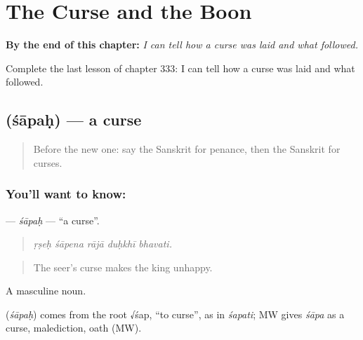 
\chapter{The Curse and the Boon}
\label{ch:sa-the-curse-and-the-boon}

\begin{chapteropening}
\textbf{By the end of this chapter:} \emph{I can tell how a curse was laid and what followed.}

Complete the last lesson of chapter 333: I can tell how a curse was laid and what followed.
\end{chapteropening}

\section[\texorpdfstring{\sk{शापः} (śāpaḥ)}{शापः (śāpaḥ)}]{ (śāpaḥ) — a curse}

\label{lesson:SA-C333-sapah}



\begin{quote}
Before the new one: say the Sanskrit for penance, then the Sanskrit for curses.
\end{quote}

\subsection*{You'll want to know: }
\textbf{} — \emph{śāpaḥ} — \textquotedblleft{}a curse\textquotedblright{}.

\begin{quote}
    
\end{quote}

\begin{quote}
\emph{ṛṣeḥ śāpena rājā duḥkhī bhavati.}
\end{quote}

\begin{quote}
The seer's curse makes the king unhappy.
\end{quote}

A masculine noun.

\begin{cousinweb}
\textbf{} (\emph{śāpaḥ}) comes from the root √śap, \textquotedblleft{}to curse\textquotedblright{}, as in \emph{śapati}; MW gives \emph{śāpa} as a curse, malediction, oath (MW).
\end{cousinweb}

